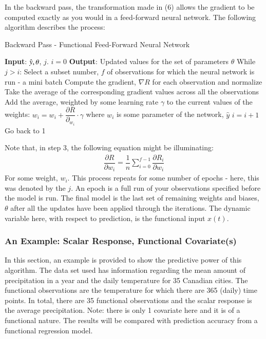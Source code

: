 \documentclass{article}
\begin{document}
\noindent In the backward pass, the transformation made in (6) allows the gradient to be computed exactly as you would in a feed-forward neural network. The following algorithm describes the process:
\begin{algorithm}[H]
\caption{Backward Pass - Functional Feed-Forward Neural Network}\label{alg:backwardfuncnn}
\begin{algorithmic}[1]
\Statex \textbf{Input}: $\Hat{y}, \theta$, $j$. $i = 0$
\Statex \textbf{Output}: Updated values for the set of parameters $\theta$
\State While $j > i$:
\State Select a subset number, $f$ of observations for which the neural network is run - a mini batch
\State Compute the gradient, $\nabla R$ for each observation and normalize
\State Take the average of the corresponding gradient values across all the observations
\State Add the average, weighted by some learning rate $\gamma$ to the current values of the weights: $w_i = w_i + \dfrac{\partial R}{\partial _{w_i}}\cdot\gamma$ where $w_i$ is some parameter of the network, $\hat{y}$
\State $i = i + 1$
\State Go back to 1
\end{algorithmic}
\end{algorithm}
\noindent Note that, in step 3, the following equation might be illuminating:
\begin{align}
 \dfrac{\partial R}{\partial w_i} = \dfrac{1}{n}\sum_{i = 0}^{f - 1}\dfrac{\partial R_i}{\partial w_i} 
\end{align}
\noindent For some weight, $w_i$. This process repeats for some number of epochs - here, this was denoted by the $j$. An epoch is a full run of your observations specified before the model is run. The final model is the last set of remaining weights and biases, $\theta$ after all the updates have been applied through the iterations. The dynamic variable here, with respect to prediction, is the functional input $x(t)$.

\subsubsection{An Example: Scalar Response, Functional Covariate(s)}

\noindent In this section, an example is provided to show the predictive power of this algorithm. The data set used has information regarding the mean amount of precipitation in a year and the daily temperature for 35 Canadian cities. The functional observations are the temperature for which there are 365 (daily) time points. In total, there are 35 functional observations and the scalar response is the average precipitation. Note: there is only 1 covariate here and it is of a functional nature. The results will be compared with prediction accuracy from a functional regression model. 
\end{document}
